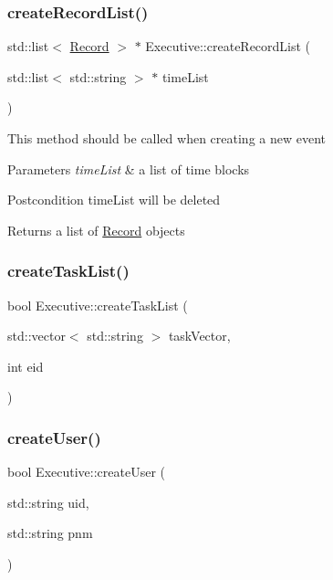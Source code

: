 \subsubsection{\texorpdfstring{create\+Record\+List()}{createRecordList()}}
{\footnotesize\ttfamily std\+::list$<$ \mbox{\hyperlink{class_record}{Record}} $>$ $\ast$ Executive\+::create\+Record\+List (\begin{DoxyParamCaption}\item[{std\+::list$<$ std\+::string $>$ $\ast$}]{time\+List }\end{DoxyParamCaption})}

This method should be called when creating a new event 
\begin{DoxyParams}{Parameters}
{\em time\+List} & a list of time blocks \\
\hline
\end{DoxyParams}
\begin{DoxyPostcond}{Postcondition}
time\+List will be deleted 
\end{DoxyPostcond}
\begin{DoxyReturn}{Returns}
a list of \mbox{\hyperlink{class_record}{Record}} objects 
\end{DoxyReturn}
\mbox{\label{class_executive_a67738864000986968126007b8cbdbb71}} 
\subsubsection{\texorpdfstring{create\+Task\+List()}{createTaskList()}}
{\footnotesize\ttfamily bool Executive\+::create\+Task\+List (\begin{DoxyParamCaption}\item[{std\+::vector$<$ std\+::string $>$}]{task\+Vector,  }\item[{int}]{eid }\end{DoxyParamCaption})}

\mbox{\label{class_executive_aaf4e73a2e3e6515a1e15569d50ed7017}} 
\subsubsection{\texorpdfstring{create\+User()}{createUser()}}
{\footnotesize\ttfamily bool Executive\+::create\+User (\begin{DoxyParamCaption}\item[{std\+::string}]{uid,  }\item[{std\+::string}]{pnm }\end{DoxyParamCaption})}

